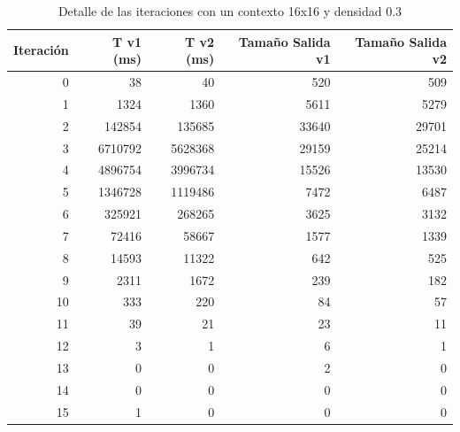 	\begin{table}[h]
		\caption{Detalle de las iteraciones con un contexto 16x16 y densidad 0.3}
		\begin{center}
			\begin{tabular}{|r|r|r|r|r|}
				\hline
				Iteración  & T v1 (ms) & T v2 (ms) & Tamaño Salida v1  & Tamaño Salida v2  \\ \hline \hline
				0 & 38 & 40 & 520 & 509 \\ \hline
				1 & 1324 & 1360 & 5611 & 5279 \\ \hline
				2 & 142854 & 135685 & 33640 & 29701 \\ \hline
				3 & 6710792 & 5628368 & 29159 & 25214 \\ \hline
				4 & 4896754 & 3996734 & 15526 & 13530 \\ \hline
				5 & 1346728 & 1119486 & 7472 & 6487 \\ \hline
				6 & 325921 & 268265 & 3625 & 3132 \\ \hline
				7 & 72416 & 58667 & 1577 & 1339 \\ \hline
				8 & 14593 & 11322 & 642 & 525 \\ \hline
				9 & 2311 & 1672 & 239 & 182 \\ \hline
				10 & 333 & 220 & 84 & 57 \\ \hline
				11 & 39 & 21 & 23 & 11 \\ \hline
				12 & 3 & 1 & 6 & 1 \\ \hline
				13 & 0 & 0 & 2 & 0 \\ \hline
				14 & 0 & 0 & 0 & 0 \\ \hline
				15 & 1 & 0 & 0 & 0 \\ \hline
			\end{tabular}
		\end{center}
		\label{iteraciones16d3}
	\end{table}
	
		
		
		
		
		
	
		
